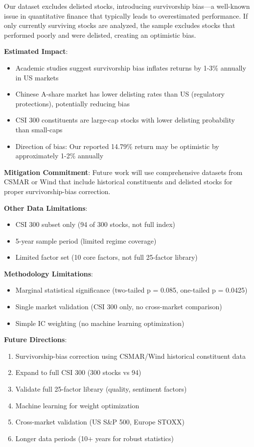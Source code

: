 Our dataset excludes delisted stocks, introducing survivorship bias---a well-known issue in quantitative finance that typically leads to overestimated performance. If only currently surviving stocks are analyzed, the sample excludes stocks that performed poorly and were delisted, creating an optimistic bias.

\textbf{Estimated Impact}:
\begin{itemize}
    \item Academic studies suggest survivorship bias inflates returns by 1-3\% annually in US markets
    \item Chinese A-share market has lower delisting rates than US (regulatory protections), potentially reducing bias
    \item CSI 300 constituents are large-cap stocks with lower delisting probability than small-caps
    \item Direction of bias: Our reported 14.79\% return may be optimistic by approximately 1-2\% annually
\end{itemize}

\textbf{Mitigation Commitment}: Future work will use comprehensive datasets from CSMAR or Wind that include historical constituents and delisted stocks for proper survivorship-bias correction.

\textbf{Other Data Limitations}:
\begin{itemize}
    \item CSI 300 subset only (94 of 300 stocks, not full index)
    \item 5-year sample period (limited regime coverage)
    \item Limited factor set (10 core factors, not full 25-factor library)
\end{itemize}

\textbf{Methodology Limitations}:
\begin{itemize}
    \item Marginal statistical significance (two-tailed p = 0.085, one-tailed p = 0.0425)
    \item Single market validation (CSI 300 only, no cross-market comparison)
    \item Simple IC weighting (no machine learning optimization)
\end{itemize}

\textbf{Future Directions}:
\begin{enumerate}
    \item Survivorship-bias correction using CSMAR/Wind historical constituent data
    \item Expand to full CSI 300 (300 stocks vs 94)
    \item Validate full 25-factor library (quality, sentiment factors)
    \item Machine learning for weight optimization
    \item Cross-market validation (US S\&P 500, Europe STOXX)
    \item Longer data periods (10+ years for robust statistics)
\end{enumerate}

